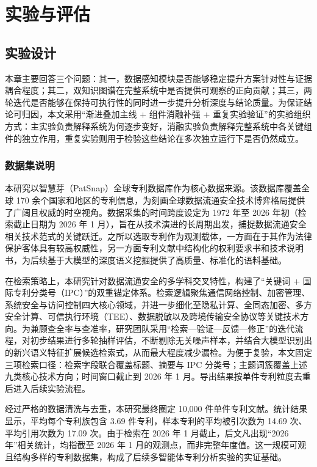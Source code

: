 \section{实验与评估}

\subsection{实验设计}

本章主要回答三个问题：其一，数据感知模块是否能够稳定提升方案针对性与证据耦合程度；其二，双知识图谱在完整系统中是否提供可观察的正向贡献；其三，两轮迭代是否能够在保持可执行性的同时进一步提升分析深度与结论质量。为保证结论可归因，本文采用“渐进叠加主线 + 组件消融补强 + 重复实验验证”的实验组织方式：主实验负责解释系统为何逐步变好，消融实验负责解释完整系统中各关键组件的独立作用，重复实验则用于检验这些结论在多次独立运行下是否仍然成立。

\subsubsection{数据集说明}

本研究以智慧芽（PatSnap）全球专利数据库作为核心数据来源。该数据库覆盖全球 170 余个国家和地区的专利信息，为刻画全球数据流通安全技术博弈格局提供了广阔且权威的时空视角。数据采集的时间跨度设定为 1972 年至 2026 年初（检索截止日期为 2026 年 1 月），旨在从技术演进的长周期出发，捕捉数据流通安全相关技术范式的关键跃迁。之所以选取专利作为观测载体，一方面在于其作为法律保护客体具有较高权威性，另一方面专利文献中结构化的权利要求书和技术说明书，为后续基于大模型的深度语义挖掘提供了高质量、标准化的语料基础。

在检索策略上，本研究针对数据流通安全的多学科交叉特性，构建了“关键词 + 国际专利分类号（IPC）”的双重锚定体系。检索逻辑聚焦通信网络控制、加密管理、系统安全与访问控制四大核心领域，并进一步细化至隐私计算、全同态加密、多方安全计算、可信执行环境（TEE）、数据脱敏以及跨境传输安全协议等关键技术方向。为兼顾查全率与查准率，研究团队采用“检索—验证—反馈—修正”的迭代流程，对初步结果进行多轮抽样评估，不断剔除无关噪声样本，并结合大模型识别出的新兴语义特征扩展候选检索式，从而最大程度减少漏检。为便于复验，本文固定三项检索口径：检索字段联合覆盖标题、摘要与 IPC 分类号；主题词簇覆盖上述九类核心技术方向；时间窗口截止到 2026 年 1 月。导出结果按单件专利粒度去重后进入后续实验流程。

经过严格的数据清洗与去重，本研究最终圈定 10,000 件单件专利文献。统计结果显示，平均每个专利族包含 3.69 件专利，样本专利的平均被引次数为 14.69 次、平均引用次数为 17.09 次。由于检索在 2026 年 1 月截止，后文凡出现“2026 年”相关统计，均指截至 2026 年 1 月的观测点，而非完整年度值。这一规模可观且结构多样的专利数据集，构成了后续多智能体专利分析实验的实证基础。

